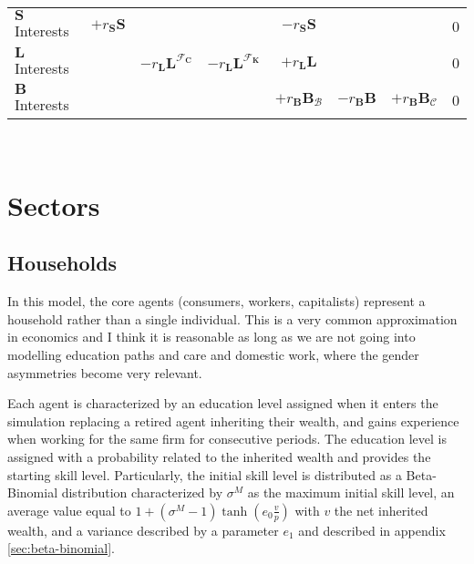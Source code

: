 \documentclass[a4paper, headings=standardclasses]{scrartcl}
\begin{document}
{\begin{tabularx}{\textwidth}{@{} Y|cccccc|l @{}}
		\midrule
		$\mathbf{S}$ Interests & $+r_{\mathbf{S}} \mathbf{S}$             &                                                         &                                                                        & $-r_{\mathbf{S}} \mathbf{S}$           &                                          &                                        & 0    \\
		$\mathbf{L}$ Interests &                                          & $-r_{\mathbf{L}} \mathbf{L}^{\mathcal{F}_{\mathbf{C}}}$ & $-r_{\mathbf{L}} \mathbf{L}^{\mathcal{F}_{\mathbf{K}}}$                & $+r_{\mathbf{L}} \mathbf{L}$           &                                          &                                        & 0    \\
		$\mathbf{B}$ Interests &                                          &                                                         &                                                                        & $+r_\mathbf{B} \mathbf{B}_\mathcal{B}$ & $-r_\mathbf{B} \mathbf{B}$               & $+r_\mathbf{B} \mathbf{B}_\mathcal{C}$ & 0    \\
		\bottomrule
	\end{tabularx}
}\\

\section{Sectors}
\subsection{Households}
In this model, the core agents (consumers, workers, capitalists) represent a household rather than a single individual. This is a very common approximation in economics and I think it is reasonable as long as we are not going into modelling education paths and care and domestic work, where the gender asymmetries become very relevant.

Each agent is characterized by an education level assigned when it enters the simulation replacing a retired agent inheriting their wealth, and gains experience when working for the same firm for consecutive periods.
The education level is assigned with a probability related to the inherited wealth and provides the starting skill level.
Particularly, the initial skill level is distributed as a Beta-Binomial distribution characterized by $\sigma^M$ as the maximum initial skill level, an average value equal to $1+(\sigma^M-1)\tanh(e_0 \frac{v}{p})$ with $v$ the net inherited wealth, and a variance described by a parameter $e_1$ and described in appendix \ref{sec:beta-binomial}.
\end{document}
